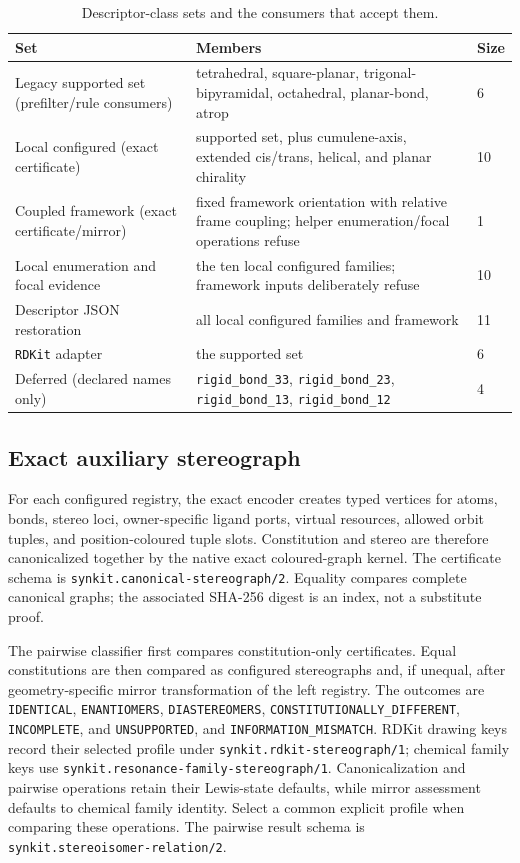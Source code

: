 \documentclass[pdflatex,sn-mathphys-num,referee,lineno]{sn-jnl}
\newcommand{\rdkit}{\texttt{RDKit}\xspace}
\newcommand{\code}[1]{\texttt{#1}}
\theoremstyle{plain}
\theoremstyle{remark}
\theoremstyle{definition}
\begin{document}
\begin{table}[htbp]
\caption{Descriptor-class sets and the consumers that accept them.}
\label{tab:classsets}
\centering
\begin{tabularx}{\textwidth}{@{}lXl@{}}
\toprule
Set & Members & Size \\
\midrule
Legacy supported set (prefilter/rule consumers) & tetrahedral, square-planar,
trigonal-bipyramidal, octahedral, planar-bond, atrop & 6 \\
Local configured (exact certificate) & supported set, plus
cumulene-axis, extended cis/trans, helical, and planar chirality & 10 \\
Coupled framework (exact certificate/mirror) & fixed framework orientation
with relative frame coupling; helper enumeration/focal operations refuse & 1 \\
Local enumeration and focal evidence & the ten local configured families;
framework inputs deliberately refuse & 10 \\
Descriptor JSON restoration & all local configured families and framework & 11 \\
\rdkit{} adapter & the supported set & 6 \\
Deferred (declared names only) & \code{rigid\_bond\_33}, \code{rigid\_bond\_23},
\code{rigid\_bond\_13}, \code{rigid\_bond\_12} & 4 \\
\bottomrule
\end{tabularx}
\end{table}

\subsection{Exact auxiliary stereograph}

For each configured registry, the exact encoder creates typed vertices for
atoms, bonds, stereo loci, owner-specific ligand ports, virtual resources,
allowed orbit tuples, and position-coloured tuple slots.  Constitution and
stereo are therefore canonicalized together by the native exact coloured-graph
kernel.  The certificate schema is
\code{synkit.canonical-stereograph/2}.  Equality compares complete canonical
graphs; the associated SHA-256 digest is an index, not a substitute proof.

The pairwise classifier first compares constitution-only certificates.  Equal
constitutions are then compared as configured stereographs and, if unequal,
after geometry-specific mirror transformation of the left registry.  The
outcomes are \code{IDENTICAL}, \code{ENANTIOMERS}, \code{DIASTEREOMERS},
\code{CONSTITUTIONALLY\_DIFFERENT}, \code{INCOMPLETE}, and
\code{UNSUPPORTED}, and \code{INFORMATION\_MISMATCH}. RDKit drawing keys
record their selected profile under \code{synkit.rdkit-stereograph/1}; chemical
family keys use \code{synkit.resonance-family-stereograph/1}. Canonicalization
and pairwise operations retain their Lewis-state defaults, while mirror
assessment defaults to chemical family identity. Select a common explicit
profile when comparing these operations. The pairwise result schema is
\code{synkit.stereoisomer-relation/2}.
\end{document}
